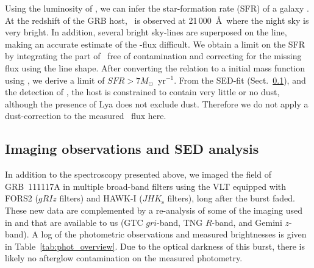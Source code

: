 \documentclass{aa}    %
\begin{document}
Using the luminosity of \ha, we can infer the star-formation rate (SFR) of a 
galaxy \citep{Kennicutt1998}. At the redshift of the GRB host, \ha~is observed at 
21\,000~\AA~where the night sky is very bright. In addition, several bright sky-lines 
are superposed on the line, making an accurate estimate of the \ha-flux difficult. 
We obtain a limit on the SFR by integrating the part of \ha~free of contamination and 
correcting for the missing flux using the line shape. After converting the 
\citet{Kennicutt1998} relation to a \citet{Chabrier2003} initial mass function using
\citet{Madau2014}, we derive a limit of $SFR > 7 M_\odot$~yr$^{-1}$. 
From the SED-fit (Sect.~\ref{SED}), and the detection of \lya, the host is
constrained to contain very little or no dust, although the presence of Lya does
not exclude dust. Therefore we do not apply a dust-correction to the measured
\ha~flux here.




\subsection{Imaging observations and SED analysis} \label{SED}

In addition to the spectroscopy presented above, we imaged the field of
GRB~111117A in multiple broad-band filters using the VLT equipped with FORS2
($gRIz$ filters) and HAWK-I ($JHK_{\mathrm{s}}$ filters), long after the burst
faded. These new data are complemented by a re-analysis of some of the imaging
used in \citet{Margutti2012} and \citet{Sakamoto2013} that are available to us
(GTC $gri$-band, TNG $R$-band, and Gemini $z$-band). A log of the photometric
observations and measured brightnesses is given in
Table~\ref{tab:phot_overview}. Due to the optical darkness of this burst, there
is likely no afterglow contamination on the measured photometry.
\end{document}
